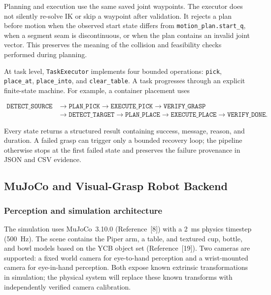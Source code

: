 Planning and execution use the same saved joint waypoints. The executor does
not silently re-solve IK or skip a waypoint after validation. It rejects a
plan before motion when the observed start state differs from
\texttt{motion\_plan.start\_q}, when a segment seam is discontinuous, or when
the plan contains an invalid joint vector. This preserves the meaning of the
collision and feasibility checks performed during planning.

At task level, \texttt{TaskExecutor} implements four bounded operations:
\texttt{pick}, \texttt{place\_at}, \texttt{place\_into}, and
\texttt{clear\_table}.  A task progresses through an explicit finite-state
machine. For example, a container placement uses

\begin{equation*}
\begin{split}
\texttt{DETECT\_SOURCE} &\rightarrow \texttt{PLAN\_PICK}
\rightarrow \texttt{EXECUTE\_PICK}
\rightarrow \texttt{VERIFY\_GRASP} \\
&\rightarrow \texttt{DETECT\_TARGET}
\rightarrow \texttt{PLAN\_PLACE}
\rightarrow \texttt{EXECUTE\_PLACE}
\rightarrow \texttt{VERIFY\_DONE}.
\end{split}
\end{equation*}

Every state returns a structured result containing success, message, reason,
and duration. A failed grasp can trigger only a bounded recovery loop; the
pipeline otherwise stops at the first failed state and preserves the failure
provenance in JSON and CSV evidence.

\subsection{MuJoCo and Visual-Grasp Robot Backend}
\label{sec:visual-grasp-backend}

\subsubsection{Perception and simulation architecture}

The simulation uses MuJoCo~3.10.0 (Reference~[8]) with a 2~ms physics timestep
(500~Hz).  The
scene contains the Piper arm, a table, and textured cup, bottle, and bowl
models based on the YCB object set (Reference~[19]). Two cameras are supported:
a fixed world camera for eye-to-hand
perception and a wrist-mounted camera for eye-in-hand perception.  Both expose
known extrinsic transformations in simulation; the physical system will
replace these known transforms with independently verified camera
calibration.

